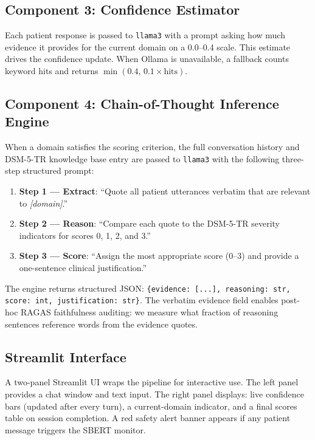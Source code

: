 \documentclass[11pt,twocolumn]{article}
\begin{document}
\subsection{Component 3: Confidence Estimator}

Each patient response is passed to \texttt{llama3} with a prompt asking how much evidence it provides for the current domain on a 0.0--0.4 scale. This estimate drives the confidence update. When Ollama is unavailable, a fallback counts keyword hits and returns $\min(0.4,\, 0.1 \times \text{hits})$.

\subsection{Component 4: Chain-of-Thought Inference Engine}

When a domain satisfies the scoring criterion, the full conversation history and DSM-5-TR knowledge base entry are passed to \texttt{llama3} with the following three-step structured prompt:

\begin{enumerate}
  \item \textbf{Step 1 — Extract}: ``Quote all patient utterances verbatim that are relevant to \textit{[domain]}.''
  \item \textbf{Step 2 — Reason}: ``Compare each quote to the DSM-5-TR severity indicators for scores 0, 1, 2, and 3.''
  \item \textbf{Step 3 — Score}: ``Assign the most appropriate score (0--3) and provide a one-sentence clinical justification.''
\end{enumerate}

The engine returns structured JSON: \texttt{\{evidence: [...], reasoning: str, score: int, justification: str\}}. The verbatim evidence field enables post-hoc RAGAS faithfulness auditing: we measure what fraction of reasoning sentences reference words from the evidence quotes.

\subsection{Streamlit Interface}

A two-panel Streamlit UI wraps the pipeline for interactive use. The left panel provides a chat window and text input. The right panel displays: live confidence bars (updated after every turn), a current-domain indicator, and a final scores table on session completion. A red safety alert banner appears if any patient message triggers the SBERT monitor.
\end{document}
